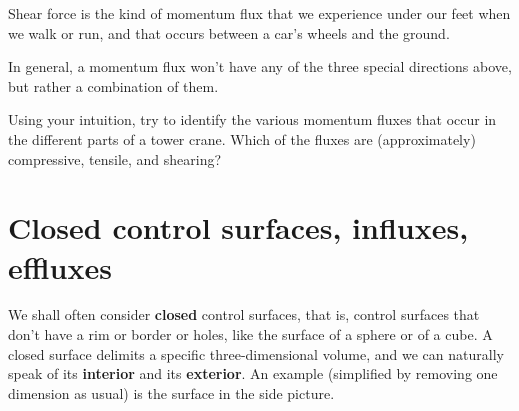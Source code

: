 \documentclass[a4paper,12pt,%
onecolumn,oneside,titlepage,%
british%
]{memoir}
\renewcommand*{\|}[1][]{\nonscript\:#1\vert\nonscript\:\mathopen{}}
\begin{document}
Shear force is the kind of momentum flux that we experience under our feet when we walk or run, and that occurs between a car's wheels and the ground.

\bigskip

In general, a momentum flux won't have any of the three special directions above, but rather a combination of them.


\begin{exercise}
  Using your intuition, try to identify the various momentum fluxes that occur in the different parts of a tower crane. Which of the fluxes are (approximately) compressive, tensile, and shearing?
\end{exercise}



\section{Closed control surfaces, influxes, effluxes}
\label{sec:in_out_flux}

We shall often consider \textbf{closed} control surfaces, that is, control surfaces that don't have a rim or border or holes, like the surface of a sphere or of a cube. A closed surface delimits a specific three-dimensional volume, and we can naturally speak of its \textbf{interior} and its \textbf{exterior}. An example (simplified by removing one dimension as usual) is the surface in the side picture.
\end{document}
